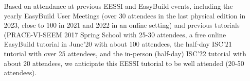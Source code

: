 
Based on attendance at previous EESSI and EasyBuild events, including the yearly EasyBuild User Meetings (over 30 attendees in the last physical edition in 2023, close to 100 in 2021 and 2022 in an online setting) and previous tutorials (PRACE-VI-SEEM 2017 Spring School with 25-30 attendees, a free online EasyBuild tutorial in June'20 with about 100 attendees, the half-day ISC'21 tutorial with over 25 attendees, and the in-person (half-day) ISC'22 tutorial with about 20 attendees, we anticipate this EESSI tutorial to be well attended (20-50 attendees).




